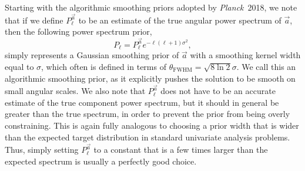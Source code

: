 \documentclass{aa}
\def\Planck{\textit{Planck}}
\renewcommand{\a}[0]{\vec{a}}
\begin{document}
Starting with the algorithmic smoothing priors adopted by
\Planck\ 2018, we note that if we define $P_{\ell}^{\a}$ to be an
estimate of the true angular power spectrum of $\a$, then the
following power spectrum prior, 
\begin{equation}
  P_{\ell} = P^{\a}_{\ell}e^{-\ell(\ell+1)\sigma^2},
  \label{eq:gauss_smooth_prior}
\end{equation}
simply represents a Gaussian smoothing prior of $\a$ with a smoothing
kernel width equal to $\sigma$, which often is defined in terms of
$\theta_\mathrm{FWHM}=\sqrt{8\ln 2}\sigma$. We call this an
algorithmic smoothing prior, as it explicitly pushes the solution to
be smooth on small angular scales. We also note that $P_{\ell}^{\a}$
does not have to be an accurate estimate of the true component power
spectrum, but it should in general be greater than the true
spectrum, in order to prevent the prior from being overly
constraining. This is again fully analogous to choosing a prior width
that is wider than the expected target distribution in standard
univariate analysis problems. Thus, simply setting $P_{\ell}^{\a}$ to
a constant that is a few times larger than the expected spectrum is
usually a perfectly good choice.
\end{document}
